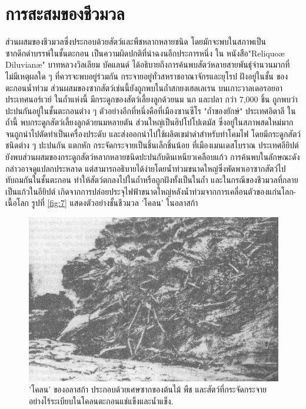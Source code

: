 \documentclass[10pt,twocolumn,letterpaper]{article}
\begin{document}
\section{การสะสมของชีวมวล}

ส่วนผสมของชีวมวลซึ่งประกอบด้วยสัตว์และพืชหลากหลายชนิด โดยมักจะพบในสภาพเป็นซากดึกดำบรรพ์ในชั้นตะกอน เป็นความผิดปกติที่น่าฉงนอีกประการหนึ่ง ใน หนังสือ"Reliquoæ Diluvianæ" บาทหลวงวิลเลียม บัคแลนด์ ได้อธิบายถึงการค้นพบสัตว์หลายสายพันธุ์จำนวนมากที่ไม่มีเหตุผลใด ๆ ที่ควรจะพบอยู่ร่วมกัน กระจายอยู่ทั่วสหราชอาณาจักรและยุโรป ฝังอยู่ในชั้น ของตะกอนน้ำท่วม \cite{58} ส่วนผสมของซากสัตว์เช่นนี้ยังถูกพบในถ้ำสกยงเฮลเลเรน บนเกาะวาลเดอรอยอา ประเทศนอร์เวย์ ในถ้ำแห่งนี้ มีกระดูกของสัตว์เลี้ยงลูกด้วยนม นก และปลา กว่า 7,000 ชิ้น ถูกพบว่าปะปนกันอยู่ในชั้นตะกอนต่าง ๆ \cite{59} ตัวอย่างอีกที่หนึ่งคือที่เมืองซานซีโร "ถ้ำของยักษ์" ประเทศอิตาลี ในถ้ำนี้ พบกระดูกสัตว์เลี้ยงลูกด้วยนมหลายตัน ส่วนใหญ่เป็นฮิปโปโปเตมัส ซึ่งอยู่ในสภาพสดใหม่มากจนถูกนำไปตัดทำเป็นเครื่องประดับ และส่งออกนำไปใช้ผลิตเขม่าดำสำหรับทำโคมไฟ โดยมีกระดูกสัตว์ชนิดต่าง ๆ ปะปนกัน แตกหัก กระจัดกระจายเป็นชิ้นเล็กชิ้นน้อย \cite{60,61} ที่เมืองเมนเดสโบราณ ประเทศอียิปต์ ยังพบส่วนผสมของกระดูกสัตว์หลากหลายชนิดปะปนกับดินเหนียวเคลือบแก้ว \cite{57} การค้นพบในลักษณะดังกล่าวอาจดูแปลกประหลาด แต่สามารถอธิบายได้ง่ายโดยน้ำท่วมขนาดใหญ่ซึ่งพัดพาเอาซากสัตว์ไปทับถมกันในชั้นตะกอน  ทำให้สัตว์ตกลงไปในถ้ำหรือถูกฝังทั้งเป็นในถ้ำ และในกรณีของชีวมวลที่กลายเป็นแก้วในอียิปต์ เกิดจากการปล่อยประจุไฟฟ้าขนาดใหญ่หลังน้ำท่วมจากการเคลื่อนตัวของแก่นโลก-เนื้อโลก รูปที่ \ref{fig:7} แสดงตัวอย่างชั้นชีวมวล 'โคลน' ในอลาสก้า \cite{56}

\begin{figure}[t]
\begin{center}
   \includegraphics[width=1\linewidth]{muck-crop.jpeg}
\end{center}
   \caption{'โคลน' ของอลาสก้า ประกอบด้วยเศษซากของต้นไม้ พืช และสัตว์ที่กระจัดกระจายอย่างไร้ระเบียบในโคลนตะกอนแช่แข็งและน้ำแข็ง\cite{146}.}
\label{fig:7}
\label{fig:onecol}
\end{figure}
\end{document}
